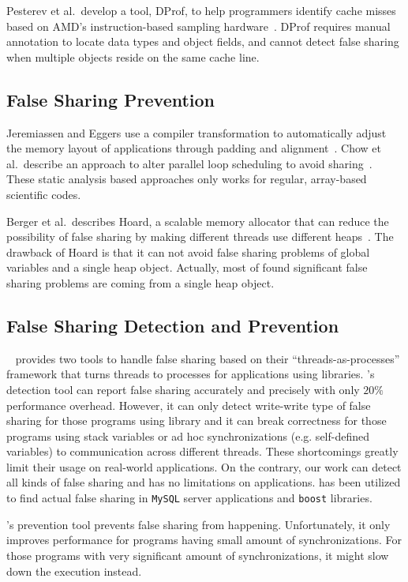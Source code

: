 Pesterev et al.\ develop a tool, DProf, to help programmers identify cache misses based on
AMD's instruction-based sampling hardware~\cite{DProf}.
DProf requires manual annotation to locate data types and object fields, and cannot detect false
sharing when multiple objects reside on the same cache line.

\subsection{False Sharing Prevention}
Jeremiassen and Eggers use a compiler transformation to automatically adjust the
memory layout of applications through padding and alignment~\cite{falseshare:compile}.
Chow et al.\ describe an approach to alter parallel loop scheduling to avoid
sharing~\cite{falseshare:schedule}.
These static analysis based approaches only works for regular,
array-based scientific codes.

Berger et al.\ describes Hoard, a scalable memory allocator that can reduce
the possibility of false sharing
by making different threads use different heaps~\cite{Hoard}.
The drawback of Hoard is that it can not avoid false sharing problems of global variables 
and a single heap object.
Actually, most of found significant false sharing problems are coming from a single heap object. 

\subsection{False Sharing Detection and Prevention}
\sheriff{}~\cite{sheriff} provides two tools to handle false sharing based on 
their ``threads-as-processes'' framework that turns threads to processes for applications using 
\pthreads{} libraries.
\Sheriff{}'s detection tool 
can report false sharing accurately and precisely with only $20\%$ performance overhead.
However, it can only detect write-write type of false sharing for those programs 
using \pthreads{} library and it can break correctness for those programs using 
stack variables or ad hoc synchronizations (e.g. self-defined variables)
to communication across different threads.
These shortcomings greatly limit their usage on real-world applications.  
On the contrary, our work can detect all kinds of false sharing and has no limitations on applications.
\Predator{} has been utilized to find actual false sharing in \texttt{MySQL} server applications 
and \texttt{boost} libraries.

\Sheriff{}'s prevention tool prevents false sharing from happening. 
Unfortunately, it only improves performance for programs having small amount of synchronizations. 
For those programs with very significant 
amount of synchronizations, it might slow down the execution instead.

